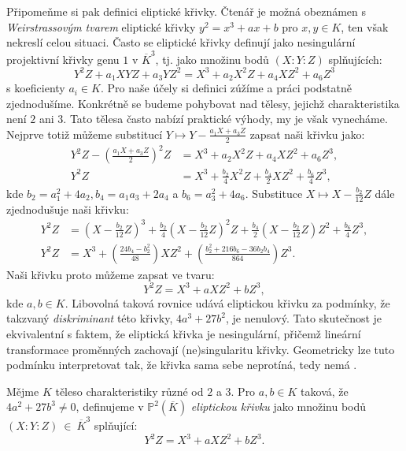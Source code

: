 \documentclass[12pt]{report}
\begin{document}
Připomeňme si pak definici eliptické křivky. Čtenář je možná obeznámen s \textit{Weirstrassovým tvarem} eliptické křivky $y^2 = x^3+ax+b$ pro $x,y \in K$, ten však nekreslí celou situaci. Často se eliptické křivky definují jako nesingulární projektivní křivky genu $1$ v $\overline{K}^3$, tj. jako množinu bodů $(X:Y:Z)$ splňujících:
\begin{equation*}
Y^2 Z + a_1 XYZ + a_3 Y Z^2 = X^3 + a_2 X^2 Z + a_4 X Z^2 + a_6 Z^3
\end{equation*}
s koeficienty $a_i \in K$. Pro naše účely si definici zúžíme a práci podstatně zjednodušíme. Konkrétně se budeme pohybovat nad tělesy, jejichž charakteristika není $2$ ani $3$. Tato tělesa často nabízí praktické výhody, my je však vynecháme. Nejprve totiž můžeme substitucí $Y \mapsto Y - \frac{a_1 X +a_3 Z}{2}$ zapsat naši křivku jako:
\begin{align*}
Y^2 Z -  \left(\frac{a_1 X + a_3 Z}{2}\right)^2 Z &=  X^3 + a_2 X^2 Z + a_4 X Z^2 + a_6 Z^3,\\
Y^2 Z &= X^3 + \frac{b_2}{4} X^2 Z + \frac{b_4}{2} X Z^2 + \frac{b_6}{4} Z^3,
\end{align*}
kde $b_2 = a_1 ^2 + 4 a_2, b_4 = a_1 a_3 + 2 a_4$ a $b_6 = a_3^2 + 4 a_6$. Substituce $X \mapsto X - \frac{b_2}{12} Z$ dále zjednodušuje naši křivku:
\begin{align*}
Y^2 Z &= \left( X - \frac{b_2}{12} Z\right)^3 + \frac{b_2}{4} \left( X - \frac{b_2}{12} Z\right)^2 Z + \frac{b_4}{2} \left( X - \frac{b_2}{12} Z\right) Z^2 + \frac{b_6}{4} Z^3,\\
Y^2 Z &= X^3 + \left( \frac{24 b_4 - b_2 ^2}{48} \right) X Z^2 + \left( \frac{b_2 ^2 + 216 b_6 - 36 b_2 b_4}{864} \right) Z^3.
\end{align*}
Naši křivku proto můžeme zapsat ve tvaru:
\begin{equation*}
Y^2 Z = X^3 +a X Z^2 + b Z^3,
\end{equation*}
kde $a,b \in K$. Libovolná taková rovnice udává eliptickou křivku za podmínky, že takzvaný \textit{diskriminant} této křivky, $4a^3 + 27 b^2$, je nenulový. Tato skutečnost je ekvivalentní s faktem, že eliptická křivka je nesingulární, přičemž lineární transformace proměnných zachovají (ne)singularitu křivky. Geometricky lze tuto podmínku interpretovat tak, že křivka sama sebe neprotíná, tedy nemá .

\begin{definice}
Mějme $K$ těleso charakteristiky různé od $2$ a $3$. Pro $a,b \in K$ taková, že\\ $4a^2+27b^3 \neq 0$, definujeme v $\mathbb{P}^2 (\overline{K})$ \textit{eliptickou křivku} jako množinu bodů $(X:Y:Z)~\in~\overline{K}^3$ splňující:
\begin{equation*}
Y^2 Z = X^3 + a X Z^2 + b Z^3. 
\end{equation*}
\end{definice}
\end{document}
